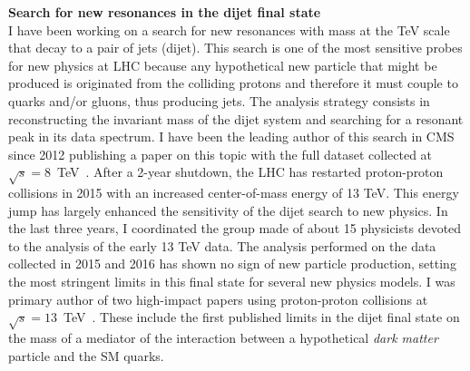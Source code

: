 \documentclass[10pt, a4paper]{article}
\begin{document}
{\bf Search for new resonances in the dijet final state}\\[0.5em]
I have been working on a search for new resonances with mass at the TeV
scale that decay to a pair of jets (dijet). This search is one of the most 
sensitive probes for new physics at LHC because any hypothetical new
particle that might be produced is originated from the
colliding protons and therefore it must couple to quarks and/or
gluons, thus producing jets. The analysis strategy consists in
reconstructing the invariant mass of the dijet system and searching for a
resonant peak in its data spectrum. I have been the leading author of this
search in CMS since 2012 publishing a paper on this topic with the
full dataset collected at $\sqrt{s}=8$~TeV~\cite{Khachatryan:2015sja}. After a 2-year
shutdown, the LHC has restarted proton-proton collisions in 2015 with an increased 
center-of-mass energy of 13 TeV. This energy jump has largely enhanced the
sensitivity of the dijet search to new physics. In the last three years, 
I coordinated the group
made of about 15 physicists devoted to the
analysis of the early 13 TeV data. The analysis performed on the data
collected in 2015 and 2016 has shown no sign of new particle
production, setting the most stringent limits in this final state 
for several new physics models. 
I was primary author of two high-impact papers using proton-proton
collisions at
$\sqrt{s}=13$~TeV~\cite{Sirunyan:2016iap,Khachatryan:2015dcf}.
These include the first published limits in the dijet final state on the
mass of a mediator of the interaction between a hypothetical 
{\it dark matter} particle and the SM quarks. \\[1em]
\end{document}
